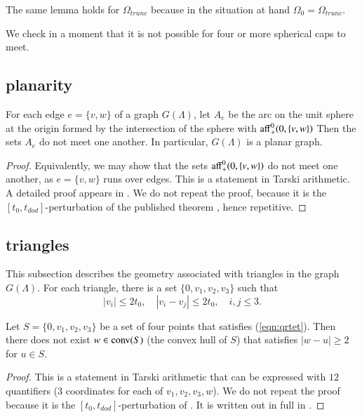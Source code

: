 The same lemma holds
for $\Omega_{trunc}$ because in the situation at hand $\Omega_0=\Omega_{trunc}$.

We check in a moment that it is not possible for four or more
spherical caps to meet.

\subsection{planarity}


\begin{lemma}  For each edge $e=\{v,w\}$ of a graph $G(\Lambda)$,
let $A_e$ be the arc on the unit sphere at the origin formed
by the intersection of the sphere with ${\operatorname{aff}}^0_+(0,\{v,w\})$
Then the sets $A_e$ do not meet one another.  In particular,
$G(\Lambda)$ is a planar graph.
\end{lemma}

\begin{proof}  Equivalently, we may show that the sets
${\operatorname{aff}}^0_+(0,\{v,w\})$ do not meet one another, as $e=\{v,w\}$
runs over edges.  This is a statement in Tarski arithmetic.
A detailed proof appears in \cite[Lemma~3.2]{arx}.  We do not
repeat the proof, because it is the $[t_0,t_{dod}]$-perturbation
of the published theorem \cite[Lemma~3.10]{Part1}, hence
repetitive.
\end{proof}

\subsection{triangles}

This subsection describes the geometry associated with
triangles in the graph $G(\Lambda)$.  For each triangle,
there is a set $\{0,v_1,v_2,v_3\}$ such that
\begin{equation}\label{eqn:qrtet}
  |v_i| \le 2t_0,\quad |v_i-v_j | \le 2 t_0,\quad i,j\le 3.
\end{equation}

\begin{lemma} Let $S=\{0,v_1,v_2,v_3\}$ be a set of four points
that satisfies (\ref{eqn:qrtet}).  Then
there does not exist $w\in{\operatorname{conv}}(S)$
(the convex hull of $S$) that satisfies $|w-u|\ge 2$ for 
$u\in S$.
\end{lemma}

\begin{proof}  This is a statement in Tarski arithmetic 
that can be expressed with $12$ quantifiers ($3$ coordinates
for each of $v_1,v_2,v_3,w$).  We do not repeat the proof
because it is the $[t_0,t_{dod}]$-perturbation of \cite[Lemma~4.15]{DCG}.
It is written out in full in \cite[Lemma~3.3]{arx}.
\end{proof}

